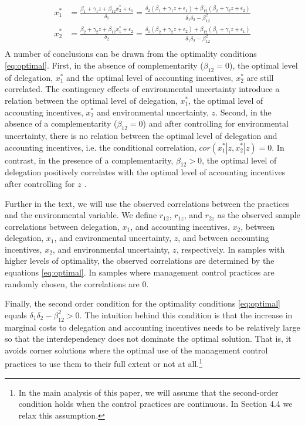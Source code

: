 \documentclass[12pt]{article}
\begin{document}
\begin{equation}\label{eq:optimal}
\begin{aligned}
x_1^* &= \frac{\beta_{1} + \gamma_1 z + \beta_{12} x_2^*  + \epsilon_{1}}{\delta_1 }
		      = \frac{\delta_2 (\beta_{1} + \gamma_1 z + \epsilon_1) 
           					+ \beta_{12} (\beta_{2} + \gamma_2 z + \epsilon_2) }
                            {\delta_1 \delta_2 - \beta_{12}^2} \\
 x_2^* &= \frac{\beta_{2} + \gamma_2 z + \beta_{12} x_1^* + \epsilon_{2}}{\delta_2  }
		      =  \frac{\delta_1 (\beta_{2} + \gamma_2 z + \epsilon_2) 
           					+ \beta_{12} (\beta_{1} + \gamma_1 z + \epsilon_1) }
                            {\delta_1 \delta_2 - \beta_{12}^2} \\
\end{aligned}
\end{equation}
A number of conclusions can be drawn from the optimality conditions \eqref{eq:optimal}. First, in the absence of complementarity ($\beta_{12}=0$), the optimal level of delegation, $x^*_1$ and the optimal level of accounting incentives, $x^*_2$ are still correlated. The contingency effects of environmental uncertainty introduce a relation between the optimal level of delegation, $x^*_1$, the optimal level of accounting incentives, $x^*_2$ and environmental uncertainty, $z$. Second, in the absence of a complementarity ($\beta_{12} = 0$) and after controlling for environmental uncertainty, there is no relation between the optimal level of delegation and accounting incentives, i.e. the conditional correlation, $cor(x^*_1 | z, x^*_2 |z) = 0$.  In contrast, in the presence of a complementarity, $\beta_{12} > 0$, the optimal level of delegation positively correlates with the optimal level of accounting incentives after controlling for $z$ \citep{arora_testing_1996}. 

Further in the text, we will use the observed correlations between the practices and the environmental variable. We define $r_{12}$, $r_{1z}$, and $r_{2z}$ as the observed sample correlations between delegation, $x_1$, and accounting incentives, $x_2$,  between delegation, $x_1$, and environmental uncertainty, $z$, and between accounting incentives, $x_2$, and environmental uncertainty, $z$, respectively. In samples with higher levels of optimality, the observed correlations are determined by the equations \eqref{eq:optimal}.  In samples where management control practices are randomly chosen, the correlations are $0$. 

Finally, the second order condition for the optimality conditions \eqref{eq:optimal} equals $\delta_1 \delta_2 - \beta_{12}^2 > 0$. The intuition behind this condition is that the increase in marginal costs to delegation and accounting incentives needs to be relatively large so that the interdependency does not dominate the optimal solution. That is, it avoids corner solutions where the optimal use of the management control practices to use them to their full extent or not at all.\footnote{In the main analysis of this paper, we will assume that the second-order condition holds when the control practices are continuous. In Section 4.4 we relax this assumption.}
\end{document}
